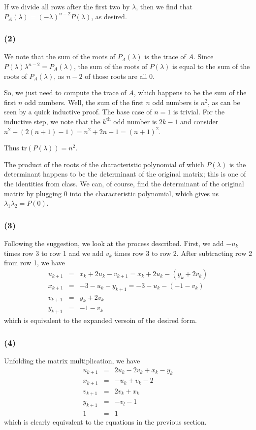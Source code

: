 \documentclass{article}
\newcommand{\trace}{\textrm{tr}}
\begin{document}
If we divide all rows after the first two by $\lambda$, then we find that 
$P_A(\lambda) = (-\lambda)^{n-2}P(\lambda)$, as desired.

\subsubsection{(2)}
We note that the sum of the roots of $P_A(\lambda)$ is the trace of $A$.
Since $P(\lambda) \lambda^{n-2} = P_A(\lambda)$, the sum of the roots of $P(\lambda)$ is equal to the sum of the roots of $P_A(\lambda)$, as $n-2$ of those roots are all 0.

So, we just need to compute the trace of $A$, which happens to be the sum of the first $n$ odd numbers.
Well, the sum of the first $n$ odd numbers is $n^2$, as can be seen by a quick inductive proof.  
The base case of $n=1$ is trivial. For the inductive step, we note that the $k^\textrm{th}$ odd number is $2k-1$ and consider 
$n^2 + (2(n+1)-1) = n^2 + 2n + 1 = (n+1)^2$.

Thus $\trace(P(\lambda)) = n^2$.

\medskip
The product of the roots of the characteristic polynomial of which $P(\lambda)$ is the determinant happens to be the determinant of the original matrix; this is one of the identities from class.
We can, of course, find the determinant of the original matrix by plugging $0$ into the characteristic polynomial, which gives us $\lambda_1\lambda_2 = P(0)$.

\subsubsection{(3)}
Following the suggestion, we look at the process described. First, we add
$-u_k$ times row 3 to row 1 and we add $v_k$ times row 3 to row 2.
After subtracting row 2 from row 1, we have
\begin{eqnarray*}
u_{k+1} &=&  x_k + 2u_k - v_{k+1} = x_k + 2u_k - (y_k + 2v_k)\\
x_{k+1} &=&  -3 - u_k - y_{k+1} = -3 - u_k - (-1 - v_k)\\
v_{k+1} &=&  y_k + 2v_k \\
y_{k+1} &=&  -1 - v_k
\end{eqnarray*}
which is equivalent to the expanded versoin of the desired form.

\subsubsection{(4)}
Unfolding the matrix multiplication, we have
\begin{eqnarray*}
u_{k+1} &=&  2u_k - 2v_k + x_k - y_k\\
x_{k+1} &=& -u_k + v_k - 2\\
v_{k+1} &=&  2v_k + x_k\\
y_{k+1} &=&  -v_l - 1\\
1 &=&  1
\end{eqnarray*}
which is clearly equivalent to the equations in the previous section.
\end{document}
